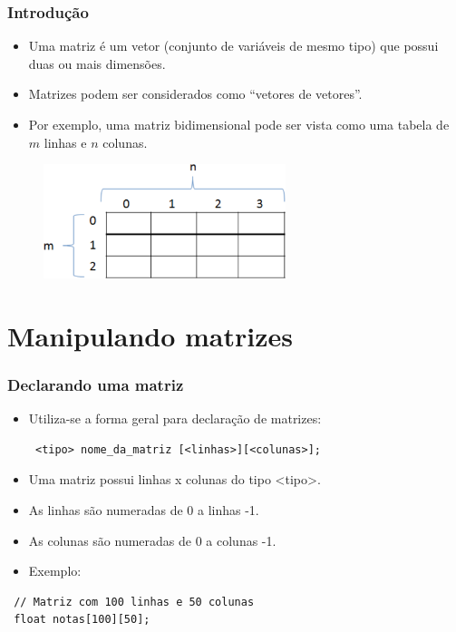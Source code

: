 \documentclass[aspectratio=169]{beamer}
\begin{document}

\begin{frame}
\frametitle{Introdução}
\begin{itemize}
\item Uma matriz é um vetor (conjunto de variáveis de mesmo tipo) que possui duas ou mais dimensões.
\item Matrizes podem ser considerados como ``vetores de vetores''.
\item Por exemplo, uma matriz bidimensional pode ser vista como uma tabela de $m$ linhas e $n$ colunas.
\end{itemize}
\begin{figure}[!h]
  \centering
  \includegraphics[width=200pt]{imgs/matrizes.png}
  \label{fig_matrizes}
\end{figure}
\end{frame}


\section{Manipulando matrizes}

\begin{frame}[fragile]
\frametitle{Declarando uma matriz}
\begin{itemize}
\item Utiliza-se a forma geral para declaração de matrizes:
\begin{lstlisting}
 <tipo> nome_da_matriz [<linhas>][<colunas>];
\end{lstlisting}
\item Uma matriz possui linhas x colunas do tipo <tipo>.
\item As linhas são numeradas de 0 a linhas -1.
\item As colunas são numeradas de 0 a colunas -1.
\item Exemplo:
\end{itemize}
\begin{lstlisting}
 // Matriz com 100 linhas e 50 colunas
 float notas[100][50];
\end{lstlisting}
\end{frame}
\end{document}
